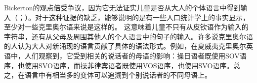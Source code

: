 Bickerton的观点倍受争议，因为它无法证实儿童是否从大人的个体语言中得到输入（\citealp[]{Samarin84a}；\citealp[]{Seuren84a}）。对于这种证据的缺乏，能够说明的是有一些人口统计学上的事实显示，至少对一些克里奥尔语来说是这样的\citep{Arends2008a}。
这意味着儿童不只有从皮钦语作为输入的字符串，还有从父母及周围其他人的个人语言中的句子的输入。许多说克里奥尔语的人认为大人对新涌现的语言贡献了具体的语法形式。例如，在夏威夷克里奥尔英语中，人们观察到，它受到相关的说话者的母语的影响：操日语者既使用SOV语序，也使用SVO语序，而操菲律宾语者既使用VOS语序，也使用SVO语序。总之，在语言中有相当多的变体可以追溯到个别说话者的不同母语上。

